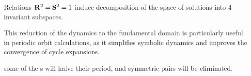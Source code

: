 Relations $\mathbf{R}^2=\mathbf{S}^2=1$
induce decomposition of the space of solutions into 4 invariant
subspaces.

This reduction of the dynamics to the fundamental domain is particularly
useful in periodic orbit calculations, as it simplifies symbolic dynamics
and improves the convergence of cycle expansions\cite{CvitaEckardt}.

some of the \po s will
halve their period, and symmetric pairs will be eliminated.




